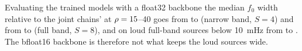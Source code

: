 Evaluating the trained models with a float32 backbone  the median $f_0$ width
relative to the joint chains' at $\rho=15$--40 goes from \ResultsNarrowFourFpBfMid{} to
\ResultsNarrowFourFpThirtyTwoMid{} (narrow band, $S=4$) and from \ResultsFullEightFpBfMid{} to
\ResultsFullEightFpThirtyTwoMid{} (full band, $S=8$), and on loud full-band sources below
\qty{10}{\milli\hertz} from \ResultsFullEightFpBfLoud{} to \ResultsFullEightFpThirtyTwoLoud. The
bfloat16 backbone is therefore not what keeps the loud sources wide.
